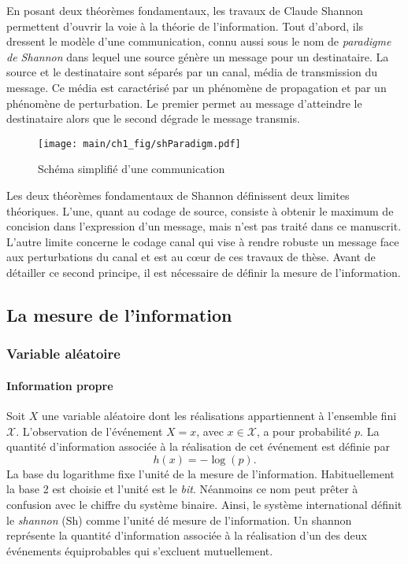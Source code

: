 En posant deux théorèmes fondamentaux, les travaux de Claude Shannon permettent d'ouvrir la voie à la théorie de 
l'information. Tout d'abord, ils dressent le modèle d'une communication, connu aussi sous le nom de 
\emph{paradigme de Shannon} dans lequel une source génère un message pour un destinataire. La source et le 
destinataire sont séparés par un canal, média de transmission du message. 
Ce média est caractérisé par un phénomène de propagation et par un phénomène de perturbation. Le premier permet au message 
d'atteindre le destinataire alors que le second dégrade le message transmis.

\begin{figure}[!h]
	\centering
	\texttt{[image: main/ch1\_fig/shParadigm.pdf]}
	\caption{\label{fig:paradigme} Schéma simplifié d'une communication}
\end{figure}


Les deux théorèmes fondamentaux de Shannon définissent deux limites théoriques. L'une, quant au codage de source, 
consiste à obtenir le maximum de concision dans l'expression d'un message, mais n'est pas traité dans ce manuscrit. 
L'autre limite concerne le codage canal qui vise à rendre robuste un message face aux perturbations du canal et est au 
cœur de ces travaux de thèse. Avant de détailler ce second principe, il est nécessaire de définir la mesure de l'information.
\subsection{La mesure de l'information}
\subsubsection{Variable aléatoire}
\paragraph*{Information propre}
Soit $X$ une variable aléatoire dont les réalisations appartiennent à l'ensemble fini $\mathcal{X}$. L'observation de 
l'événement $X=x$, avec $x\in \mathcal{X}$, a pour probabilité $p$. La quantité d'information associée à la réalisation
de cet événement est définie par \[h(x)=-\log(p).\]
La base du logarithme fixe l'unité de la mesure de l'information. Habituellement la base 2 est
choisie et l'unité est le \emph{bit}. Néanmoins ce nom peut prêter à confusion avec le chiffre du système binaire. 
Ainsi, le système international \cite{ISO} définit le \emph{shannon} (Sh) comme l'unité dé mesure de l'information. Un shannon 
représente la quantité d’information associée à la réalisation d'un des deux événements équiprobables qui s’excluent 
mutuellement. 

